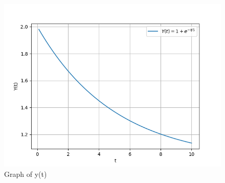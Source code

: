 \documentclass[journal,12pt,twocolumn]{IEEEtran}
\theoremstyle{remark}
\begin{document}
\begin{figure}[!h] 
    \centering
    \includegraphics[width=\columnwidth]{figs/Graph_of_y(t).png}
    \caption{Graph of y(t)}
    \label{fig:Graph1_gate_CE_30}
    \end{figure}
\end{document}
